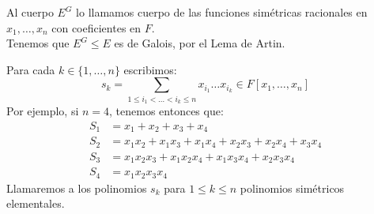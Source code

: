\begin{definicion}
    Al cuerpo $E^G$ lo llamamos cuerpo de las funciones simétricas racionales en $x_1,\ldots,x_n$ con coeficientes en $F$.\\

    \noindent
    Tenemos que $E^G\leq E$ es de Galois, por el Lema de Artin.
\end{definicion}



\begin{notacion}
    Para cada $k \in \{1,\ldots,n\}$ escribimos:
    \begin{equation*}
        s_k = \sum_{1\leq i_1< \ldots < i_k\leq n} x_{i_1} \ldots x_{i_k} \in  F[x_1, \ldots, x_n]
    \end{equation*}
    Por ejemplo, si $n= 4$, tenemos entonces que:
    \begin{align*}
        S_1 &= x_1 + x_2 + x_3 + x_4 \\
        S_2 &= x_1x_2 + x_1x_3 + x_1x_4 + x_2x_3 + x_2x_4 + x_3x_4 \\
        S_3 &= x_1x_2x_3 + x_1x_2x_4 + x_1x_3x_4 + x_2x_3x_4 \\
        S_4 &= x_1x_2x_3x_4
    \end{align*}
    Llamaremos a los polinomios $s_k$ para $1\leq k\leq n$ polinomios simétricos elementales.
\end{notacion}

